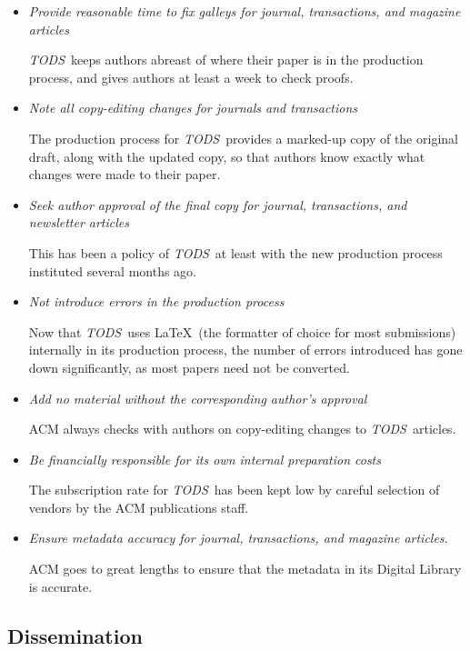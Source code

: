 \documentclass{article}
\newcommand{\tods}{{\em TODS\/}}
\begin{document}
\begin{itemize}
\item {\em Provide reasonable time to fix galleys for journal, transactions,
  and magazine articles}

  \tods\ keeps authors abreast of where their paper is in the production
  process, and gives authors at least a week to check proofs.

\item {\em Note all copy-editing changes for journals and transactions}

  The production process for \tods\ provides a marked-up copy of the
  original draft, along with the updated copy, so that authors know exactly
  what changes were made to their paper.

\item {\em Seek author approval of the final copy for journal, transactions,
  and newsletter articles}

  This has been a policy of \tods\ at least with the new production process
  instituted several months ago.

\item {\em Not introduce errors in the production process}

  Now that \tods\ uses \LaTeX\ (the formatter of choice for most
  submissions) internally in its production process, the number of errors
  introduced has gone down significantly, as most papers need not be
  converted.

\item {\em Add no material without the corresponding author's approval}

  ACM always checks with authors on copy-editing changes to \tods\ articles.

\item {\em Be financially responsible for its own internal preparation
  costs}

  The subscription rate for \tods\ has been kept low by careful selection of
  vendors by the ACM publications staff.

\item {\em Ensure metadata accuracy for journal, transactions, and magazine
  articles.}

  ACM goes to great lengths to ensure that the metadata in its Digital
  Library is accurate.
\end{itemize}

\subsection{Dissemination}
\end{document}
